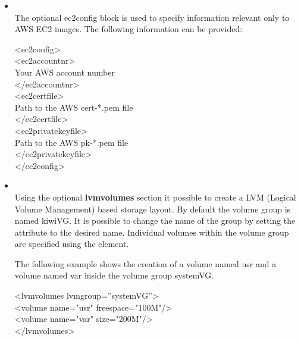 \begin{itemize}
\item {}\\
    The optional ec2config block is used to specify information relevant
    only to AWS EC2 images. The following information can be provided:

    \begin{Command}{14cm}
    <ec2config>\\
    \hspace*{1cm}<ec2accountnr>\\
    \hspace*{2cm}Your AWS account number\\
    \hspace*{1cm}</ec2accountnr>\\
    \hspace*{1cm}<ec2certfile>\\
    \hspace*{2cm}Path to the AWS cert-*.pem file\\
    \hspace*{1cm}</ec2certfile>\\
    \hspace*{1cm}<ec2privatekeyfile>\\
    \hspace*{2cm}Path to the AWS pk-*.pem file\\
    \hspace*{1cm}</ec2privatekeyfile>\\
    </ec2config>
    \end{Command}

\item {}\\
	Using the optional \textbf{lvmvolumes} section it possible to create
    a LVM (Logical Volume Management) based storage layout. By default the
    volume group is named kiwiVG. It is possible to change the name of the
    group by setting the  attribute to the desired name.
    Individual volumes within the volume group are specified using the 
     element. 

    The following example shows the creation of a volume named usr and a
    volume named var inside the volume group systemVG.

	\begin{Command}{12cm}
	<lvmvolumes lvmgroup=''systemVG''>\\
	\hspace*{1cm}<volume name="usr" freespace="100M"/>\\
	\hspace*{1cm}<volume name="var" size="200M"/>\\
	</lvmvolumes>
	\end{Command}


\end{itemize}
